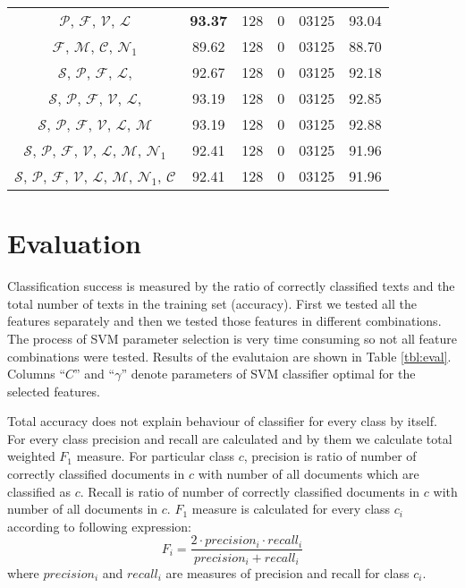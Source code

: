\documentclass{llncs}
\begin{document}
\begin{table*}[htb]
\begin{center}
\begin{tabular}{c c c r@{.}l c}
$\mathcal{P}$, $\mathcal{F}$, $\mathcal{V}$, $\mathcal{L}$ & \textbf{93.37} &
128 & 0 & 03125 & 93.04\\
$\mathcal{F}$, $\mathcal{M}$, $\mathcal{C}$, $\mathcal{N}_1$ & 89.62 & 128 & 0
& 03125 & 88.70\\
$\mathcal{S}$, $\mathcal{P}$, $\mathcal{F}$, $\mathcal{L}$, & 92.67 & 128 & 0 &
03125 & 92.18\\
$\mathcal{S}$, $\mathcal{P}$, $\mathcal{F}$, $\mathcal{V}$, $\mathcal{L}$, &
93.19 & 128 & 0 & 03125 & 92.85\\
$\mathcal{S}$, $\mathcal{P}$, $\mathcal{F}$, $\mathcal{V}$, $\mathcal{L}$,
$\mathcal{M}$ & 93.19 & 128 & 0 & 03125 & 92.88\\
$\mathcal{S}$, $\mathcal{P}$, $\mathcal{F}$, $\mathcal{V}$, $\mathcal{L}$,
$\mathcal{M}$, $\mathcal{N}_1$ & 92.41 & 128 & 0 & 03125 & 91.96\\
$\mathcal{S}$, $\mathcal{P}$, $\mathcal{F}$, $\mathcal{V}$, $\mathcal{L}$,
$\mathcal{M}$, $\mathcal{N}_1$, $\mathcal{C}$ & 92.41 & 128 & 0 & 03125 &
91.96\\ \bottomrule%
\end{tabular}%
\label{tbl:eval}%
\end{center}
\end{table*}

\section{Evaluation}
\label{sec:evaluacija}
Classification success is measured by the ratio of correctly classified texts and
the total number of texts in the training set (accuracy). First we tested all the
features separately and then we tested those features in different combinations.
The process of SVM parameter selection is very time consuming so not all feature
combinations were tested. Results of the evalutaion are shown in Table
\ref{tbl:eval}. Columns ``$C$'' and ``$\gamma$'' denote parameters of SVM
classifier optimal for the selected features.


Total accuracy does not explain behaviour of classifier for every class by
itself. For every class precision and recall are calculated and by them we
calculate total weighted $F_1$ measure. For particular class $c$, precision is
ratio of number of correctly classified documents in $c$ with number of all
documents which are classified as $c$. Recall is ratio of number of correctly
classified documents in $c$ with number of all documents in $c$. $F_1$ measure
is calculated for every class $c_i$ according to following expression:
\begin{equation}
F_i = \frac{2 \cdot precision_i \cdot recall_i}{precision_i + recall_i}
\end{equation}
where $precision_i$ and $recall_i$ are measures of precision and recall for
class $c_i$.
\end{document}
